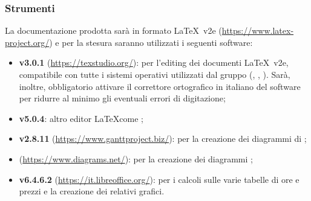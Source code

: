 	\subsubsection{Strumenti}
	La documentazione prodotta sarà in formato \LaTeX\ v2e (\url{https://www.latex-project.org/}) e per la stesura saranno utilizzati i seguenti software:	\begin{itemize}
		\item \textbf{ v3.0.1} (\url{https://texstudio.org/}): per l'editing dei documenti \LaTeX\ v2e, compatibile con tutte i sistemi operativi utilizzati dal gruppo (, , ). Sarà, inoltre, obbligatorio attivare il correttore ortografico in italiano del software per ridurre al minimo gli eventuali errori di digitazione;
		\item \textbf{ v5.0.4}: altro editor \LaTeX come ;
		\item \textbf{ v2.8.11} (\url{https://www.ganttproject.biz/}): per la creazione dei diagrammi di ;
		\item \textbf{} (\url{https://www.diagrams.net/}): per la creazione dei diagrammi ;
		\item \textbf{ v6.4.6.2} (\url{https://it.libreoffice.org/}): per i calcoli sulle varie tabelle di ore  e prezzi e la creazione dei relativi grafici.
	\end{itemize}

